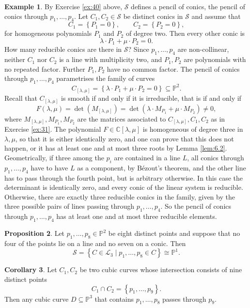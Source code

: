 \documentclass{article}
\newcommand{\C}{\mathbb{C}}
\renewcommand{\P}{\mathbb{P}}
\renewcommand{\L}{\mathcal{L}}
\renewcommand{\S}{\mathcal{S}}
\newcommand{\rb}[1]{\left( #1 \right)}
\renewcommand{\sb}[1]{\left[ #1 \right]}
\newcommand{\cb}[1]{\left\{ #1 \right\}}
\theoremstyle{definition}\newtheorem{definition}{Definition}[section]
\theoremstyle{definition}\newtheorem{notation}[definition]{Notation}
\theoremstyle{definition}\newtheorem{remark}[definition]{Remark}
\theoremstyle{definition}\newtheorem{example1}[definition]{Example}
\theoremstyle{definition}\newtheorem{fact}{Fact}
\theoremstyle{definition}\newtheorem{exercise}{Exercise}
\theoremstyle{definition}\newtheorem*{example2}{Example}
\newtheorem{proposition}[definition]{Proposition}
\newtheorem{corollary}[definition]{Corollary}
\begin{document}
\begin{example1}
By Exercise \ref{ex:40} above, $ \S $ defines a pencil of conics, the pencil of conics through $ p_1, \dots, p_4 $. Let $ C_1, C_2 \in \S $ be distinct conics in $ \S $ and assume that
$$ C_1 = \cb{P_1 = 0}, \qquad C_2 = \cb{P_2 = 0}, $$
for homogeneous polynomials $ P_1 $ and $ P_2 $ of degree two. Then every other conic is
$$ \lambda \cdot P_1 + \mu \cdot P_2 = 0. $$
How many reducible conics are there in $ \S $? Since $ p_1, \dots, p_4 $ are non-collinear, neither $ C_1 $ nor $ C_2 $ is a line with multiplicity two, and $ P_1, P_2 $ are polynomials with no repeated factor. Further $ P_1, P_2 $ have no common factor. The pencil of conics through $ p_1, \dots, p_4 $ parametrises the family of curves
$$ C_{\sb{\lambda, \mu}} = \cb{\lambda \cdot P_1 + \mu \cdot P_2 = 0} \subseteq \P^2. $$
Recall that $ C_{\sb{\lambda, \mu}} $ is smooth if and only if it is irreducible, that is if and only if
$$ F\rb{\lambda, \mu} = \det\rb{M_{\sb{\lambda, \mu}}} = \det\rb{\lambda \cdot M_{P_1} + \mu \cdot M_{P_2}} \ne 0, $$
where $ M_{\sb{\lambda, \mu}}, M_{P_1}, M_{P_2} $ are the matrices associated to $ C_{\sb{\lambda, \mu}}, C_1, C_2 $ as in Exercise \ref{ex:31}. The polynomial $ F \in \C\sb{\lambda, \mu} $ is homogeneous of degree three in $ \lambda, \mu $, so that it is either identically zero, and one can prove that this does not happen, or it has at least one and at most three roots by Lemma \ref{lem:6.2}. Geometrically, if three among the $ p_i $ are contained in a line $ L $, all conics through $ p_1, \dots, p_4 $ have to have $ L $ as a component, by B\'ezout's theorem, and the other line has to pass through the fourth point, but is arbitrary otherwise. In this case the determinant is identically zero, and every conic of the linear system is reducible. Otherwise, there are exactly three reducible conics in the family, given by the three possible pairs of lines passing through $ p_1, \dots, p_4 $. So the pencil of conics through $ p_1, \dots, p_4 $ has at least one and at most three reducible elements.
\end{example1}

\begin{proposition}
Let $ p_1, \dots, p_8 \in \P^2 $ be eight distinct points and suppose that no four of the points lie on a line and no seven on a conic. Then
$$ \S = \cb{C \in \L_3 \mid p_1, \dots, p_8 \in C} \cong \P^1. $$
\end{proposition}

\begin{corollary}
Let $ C_1, C_2 $ be two cubic curves whose intersection consists of nine distinct points
$$ C_1 \cap C_2 = \cb{p_1, \dots, p_9}. $$
Then any cubic curve $ D \subseteq \P^3 $ that contains $ p_1, \dots, p_8 $ passes through $ p_9 $.
\end{corollary}
\end{document}
